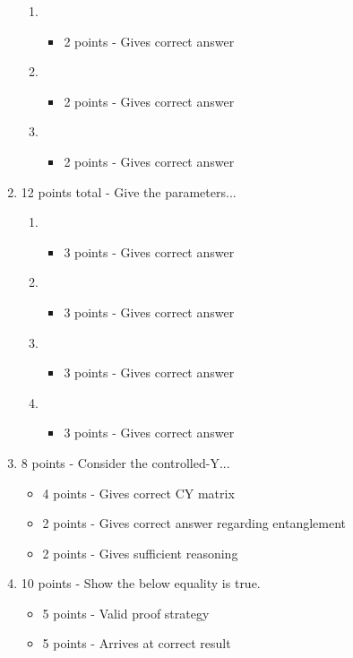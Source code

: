 \documentclass[12pt]{article}
\begin{document}
\begin{enumerate}[font=\bfseries]
\begin{enumerate}
            \item \begin{itemize}
                \item 2 points - Gives correct answer
            \end{itemize}
            \item \begin{itemize}
                \item 2 points - Gives correct answer
            \end{itemize}
            \item \begin{itemize}
                \item 2 points - Gives correct answer
            \end{itemize}
        \end{enumerate}
    \item 12 points total - Give the parameters...
        \begin{enumerate}
            \item \begin{itemize}
                \item 3 points - Gives correct answer
            \end{itemize}
            \item \begin{itemize}
                \item 3 points - Gives correct answer
            \end{itemize}
            \item \begin{itemize}
                \item 3 points - Gives correct answer
            \end{itemize}
            \item \begin{itemize}
                \item 3 points - Gives correct answer
            \end{itemize}
        \end{enumerate}
    \item 8 points - Consider the controlled-Y...
        \begin{itemize}
            \item 4 points - Gives correct CY matrix
            \item 2 points - Gives correct answer regarding entanglement
            \item 2 points - Gives sufficient reasoning
        \end{itemize}
    \item 10 points - Show the below equality is true.
        \begin{itemize}
            \item 5 points - Valid proof strategy
            \item 5 points - Arrives at correct result
        \end{itemize}
\end{enumerate}
\end{document}
